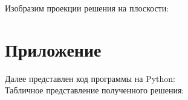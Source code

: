 \documentclass[a4paper,fontsize=14pt]{article}
\begin{document}
	\newpage
	
	Изобразим проекции решения на плоскости:
	
	\begin{figure}[h]
		\label{pic2}
		\caption{}
	\end{figure}
	
	\newpage
	
	\section{Приложение}
	
	Далее представлен код программы на Python: \\
	
	
	
	\newpage
	Табличное представление полученного решения:
	
\end{document}
